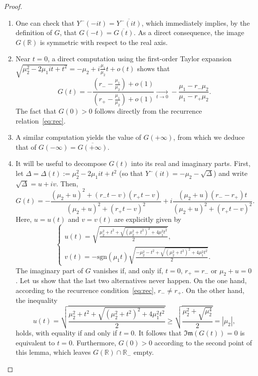 \documentclass{article}
\theoremstyle{plain}
\theoremstyle{definition}
\theoremstyle{remark}
\begin{document}
\begin{proof} 
\begin{enumerate}
    \item One can check that $Y^-(-it)=\overline{Y^-(it)}$, which immediately implies, by the definition of $G$, that $G(-t)=\overline{G(t)}$. As a direct consequence, the image $G(\mathbb R)$ is symmetric with respect to the real axis.
    \item Near $t=0$, a direct computation using the first-order Taylor expansion $\sqrt{\mu_2^2-2\mu_1it+t^2} = -\mu_2+i\frac{\mu_1}{\mu_2}t+o(t)$ shows that
    $$G(t)=-\frac{\displaystyle\left(r_--\frac{\mu_1}{\mu_2}\right) +o(1)}{\displaystyle\left(r_+-\frac{\mu_1}{\mu_2}\right)+o(1)}\xrightarrow[t\to 0]{}-\frac{\mu_1-r_-\mu_2}{\mu_1-r_+\mu_2}.$$
    The fact that $G(0)>0$ follows directly from the recurrence relation~\eqref{eq:rec}.
    \item A similar computation yields the value of $G(+\infty)$, from which we deduce that of $G(-\infty)=\overline{G(+\infty)}$.
    \item It will be useful to decompose $G(t)$ into its real and imaginary parts. First, let $\Delta=\Delta(t):=\mu_2^2-2\mu_1it+t^2$ (so that $Y^-(it)=-\mu_2-\sqrt{\Delta}$) and write $\sqrt{\Delta}=u+iv$. Then,
$$G(t)=-\frac{(\mu_2+u)^2+(r_-t-v)(r_+t-v)}{(\mu_2+u)^2+(r_+t-v)^2}+i\frac{(\mu_2+u)(r_--r_+)t}{(\mu_2+u)^2+(r_+t-v)^2}.$$
Here, $u=u(t)$ and $v=v(t)$ are explicitly given by
$$\left\{\begin{array}{l}
\displaystyle u(t)=\sqrt{\frac{\mu_2^2+t^2+\sqrt{(\mu_2^2+t^2)^2+4\mu_1^2t^2}}{2}},   \\
     \displaystyle v(t)=-\mathrm{sgn}(\mu_1t)\sqrt{\frac{-\mu_2^2-t^2+\sqrt{(\mu_2^2+t^2)^2+4\mu_1^2t^2}}{2}}.
\end{array}\right.$$
    The imaginary part of $G$ vanishes if, and only if, $t=0$, $r_+=r_-$ or $\mu_2+u=0$. Let us show that the last two alternatives never happen. On the one hand, according to the recurrence condition~\eqref{eq:rec}, $r_-\ne r_+$. On the other hand, the inequality
    $$u(t)=\sqrt{\frac{\mu_2^2+t^2+\sqrt{(\mu_2^2+t^2)^2+4\mu_1^2t^2}}{2}}\geqslant \sqrt{\frac{\mu_2^2+\sqrt{\mu_2^4}}{2}}=|\mu_2|,$$
    holds, with equality if and only if $t=0$. It follows that $\mathfrak{Im}(G(t))=0$ is equivalent to $t=0$. Furthermore, $G(0)>0$ according to the second point of this lemma, which leaves $G(\mathbb R)\cap\mathbb R_{-}$ empty. \qedhere
\end{enumerate}
\end{proof}
\end{document}
